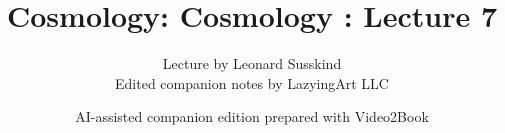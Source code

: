 \documentclass[11pt,oneside]{book}
\begin{document}
\frontmatter
\title{Cosmology: Cosmology : Lecture 7}
\author{Lecture by Leonard Susskind\\Edited companion notes by LazyingArt LLC}
\date{AI-assisted companion edition prepared with Video2Book}
\maketitle
\clearpage
\mainmatter

\end{document}
